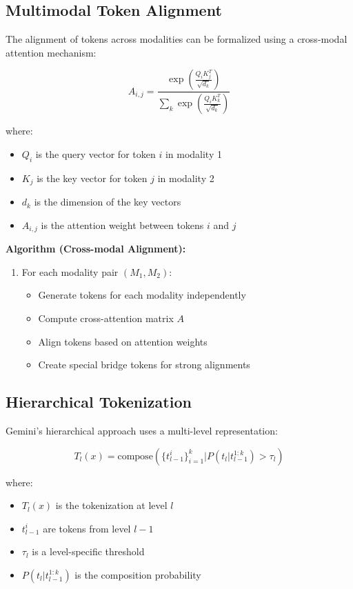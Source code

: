 \documentclass{article}
\begin{document}
\subsection{Multimodal Token Alignment}
The alignment of tokens across modalities can be formalized using a cross-modal attention mechanism:

\begin{equation*}
A_{i,j} = \frac{\exp(\frac{Q_i K_j^T}{\sqrt{d_k}})}{\sum_k \exp(\frac{Q_i K_k^T}{\sqrt{d_k}})}
\end{equation*}

where:
\begin{itemize}
\item $Q_i$ is the query vector for token $i$ in modality 1
\item $K_j$ is the key vector for token $j$ in modality 2
\item $d_k$ is the dimension of the key vectors
\item $A_{i,j}$ is the attention weight between tokens $i$ and $j$
\end{itemize}

\textbf{Algorithm (Cross-modal Alignment):}
\begin{enumerate}
\item For each modality pair $(M_1, M_2)$:
   \begin{itemize}
   \item Generate tokens for each modality independently
   \item Compute cross-attention matrix $A$
   \item Align tokens based on attention weights
   \item Create special bridge tokens for strong alignments
   \end{itemize}
\end{enumerate}

\subsection{Hierarchical Tokenization}
Gemini's hierarchical approach uses a multi-level representation:

\begin{equation*}
T_l(x) = \text{compose}(\{t_{l-1}^i\}_{i=1}^k | P(t_l|t_{l-1}^{1:k}) > \tau_l)
\end{equation*}

where:
\begin{itemize}
\item $T_l(x)$ is the tokenization at level $l$
\item $t_{l-1}^i$ are tokens from level $l-1$
\item $\tau_l$ is a level-specific threshold
\item $P(t_l|t_{l-1}^{1:k})$ is the composition probability
\end{itemize}
\end{document}
